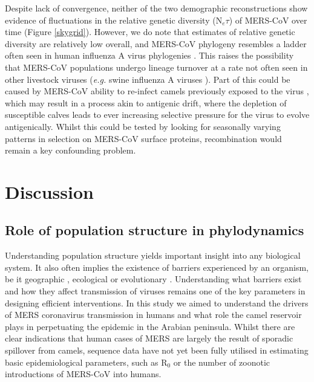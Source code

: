\documentclass[11pt,oneside,letterpaper]{article}
\def\lmc#1{\textcolor{green}{[#1]}}
\begin{document}
Despite lack of convergence, neither of the two demographic reconstructions show evidence of fluctuations in the relative genetic diversity (N$_{e}\tau$) of  MERS-CoV over time (Figure \ref{skygrid}).
However, we do note that estimates of relative genetic diversity are relatively low overall, and MERS-CoV phylogeny resembles a ladder often seen in human influenza A virus phylogenies \citep{bedford_strength_2011}.
This raises the possibility that MERS-CoV populations undergo lineage turnover at a rate not often seen in other livestock viruses (\textit{e.g.} swine influenza A viruses \citep{vijaykrishna_long-term_2011}).
Part of this could be caused by MERS-CoV ability to re-infect camels previously exposed to the virus \citep{ali_systematic_2017}, which may result in a process akin to antigenic drift, where the depletion of susceptible calves leads to ever increasing selective pressure for the virus to evolve antigenically.
Whilst this could be tested by looking for seasonally varying patterns in selection on MERS-CoV surface proteins, recombination would remain a key confounding problem.



\section*{Discussion}

\subsection*{Role of population structure in phylodynamics}
Understanding population structure yields important insight into any biological system.
It also often implies the existence of barriers experienced by an organism, be it geographic \citep{dudas_virus_2017}, ecological \citep{smith_dating_2009} or evolutionary \citep{turner_genomic_2005,dudas_reassortment_2015}.
Understanding what barriers exist and how they affect transmission of viruses remains one of the key parameters in designing efficient interventions.
In this study we aimed to understand the drivers of MERS coronavirus transmission in humans and what role the camel reservoir plays in perpetuating the epidemic in the Arabian peninsula.
Whilst there are clear indications that human cases of MERS are largely the result of sporadic spillover from camels, sequence data have not yet been fully utilised in estimating basic epidemiological parameters, such as R$_{0}$ or the number of zoonotic introductions of MERS-CoV into humans.
\end{document}
